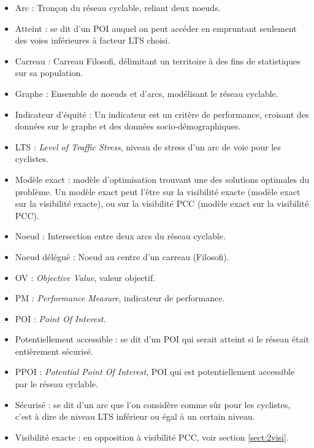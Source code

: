 \begin{itemize}
    \item Arc : Tronçon du réseau cyclable, reliant deux noeuds.
    \item Atteint : se dit d'un POI auquel on peut accéder en empruntant seulement des voies inférieures à facteur LTS choisi.
    \item Carreau : Carreau Filosofi, délimitant un territoire à des fins de statistiques sur sa population.
    \item Graphe : Ensemble de noeuds et d'arcs, modélisant le réseau cyclable.
    \item Indicateur d'équité : Un indicateur est un critère de performance, croisant des données sur le graphe et des données socio-démographiques.
    \item LTS : \emph{Level of Traffic Stress}, niveau de stress d'un arc de voie pour les cyclistes.
    \item Modèle exact : modèle d'optimisation trouvant une des solutions optimales du problème. Un modèle exact peut l'être sur la visibilité exacte (modèle exact sur la visibilité exacte), ou sur la visibilité PCC (modèle exact sur la visibilité PCC).
    \item Noeud : Intersection entre deux arcs du réseau cyclable.
    \item Noeud délégué : Noeud au centre d'un carreau (Filosofi).
    \item OV : \emph{Objective Value}, valeur objectif.
    \item PM : \emph{Performance Measure}, indicateur de performance.
    \item POI : \emph{Point Of Interest}.
    \item Potentiellement accessible : se dit d'un POI qui serait atteint si le réseau était entièrement sécurisé.
    \item PPOI : \emph{Potential Point Of Interest}, POI qui est potentiellement accessible par le réseau cyclable.
    \item Sécurisé : se dit d'un arc que l'on considère comme sûr pour les cyclistes, c'est à dire de niveau LTS inférieur ou égal à un certain niveau.
    \item Visibilité exacte : en opposition à visibilité PCC, voir section \ref{sect:2visi}.  
\end{itemize}


